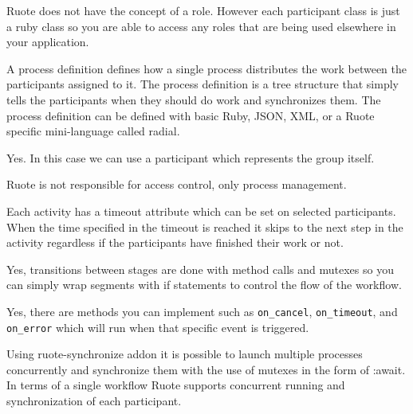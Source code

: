
Ruote does not have the concept of a role. However each participant class is just a ruby class so you are able to access any roles that are being used elsewhere in your application.


A process definition defines how a single process distributes the work between the participants assigned to it. The process definition is a tree structure that simply tells the participants when they should do work and synchronizes them. The process definition can be defined with basic Ruby, JSON, XML, or a Ruote specific mini-language called radial.


Yes. In this case we can use a participant which represents the group itself.


Ruote is not responsible for access control, only process management.


Each activity has a timeout attribute which can be set on selected participants. When the time specified in the timeout is reached it skips to the next step in the activity regardless if the participants have finished their work or not.


Yes, transitions between stages are done with method calls and mutexes so you can simply wrap segments with if statements to control the flow of the workflow.


Yes, there are methods you can implement such as \verb!on_cancel!, \verb!on_timeout!, and \verb!on_error! which will run when that specific event is triggered.


Using ruote-synchronize addon it is possible to launch multiple processes concurrently and synchronize them with the use of mutexes in the form of :await. In terms of a single workflow Ruote supports concurrent running and synchronization of each participant.

